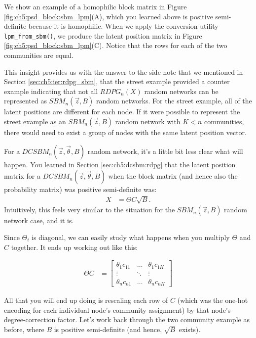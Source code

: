 We show an example of a homophilic block matrix in Figure \ref{fig:ch5:psd_block:sbm_lpm}(A), which you learned above is positive semi-definite because it is homophilic. When we apply the conversion utility \texttt{lpm\_from\_sbm()}, we produce the latent position matrix in Figure \ref{fig:ch5:psd_block:sbm_lpm}(C). Notice that the rows for each of the two communities are equal. 

This insight provides us with the answer to the side note that we mentioned in Section \ref{sec:ch5:ier:rdpg_sbm}, that the street example provided a counter example indicating that not all $RDPG_n(X)$ random networks can be represented as $SBM_n(\vec z, B)$ random networks. For the street example, all of the latent positions are different for each node. If it were possible to represent the street example as an $SBM_n(\vec z, B)$ random network with $K < n$ communities, there would need to exist a group of nodes with the same latent position vector.

For a $DCSBM_n(\vec z, \vec \theta, B)$ random network, it's a little bit less clear what will happen. You learned in Section \ref{sec:ch5:dcsbm:rdpg} that the latent position matrix for a $DCSBM_n(\vec z, \vec \theta, B)$ when the block matrix (and hence also the probability matrix) was positive semi-definite was:
\begin{align*}
    X &= \Theta C \sqrt B.
\end{align*}
Intuitively, this feels very similar to the situation for the $SBM_n(\vec z, B)$ random network case, and it is.

Since $\Theta_i$ is diagonal, we can easily study what happens when you multiply $\Theta$ and $C$ together. It ends up working out like this:

\begin{align*}
    \Theta C &= \begin{bmatrix}
        \theta_1 c_{11} & \hdots & \theta_1 c_{1K} \\
        \vdots & \ddots & \vdots \\
        \theta_n c_{n1} & \hdots & \theta_n c_{nK}
    \end{bmatrix}
\end{align*}

All that you will end up doing is rescaling each row of $C$ (which was the one-hot encoding for each individual node's community assignment) by that node's degree-correction factor. Let's work back through the two community example as before, where $B$ is positive semi-definite (and hence, $\sqrt B$ exists). 

